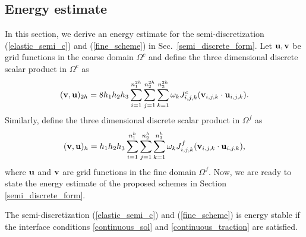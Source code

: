 \subsection{Energy estimate}\label{sec_energy}
In this section, we derive an energy estimate for the semi-discretization (\ref{elastic_semi_c}) and (\ref{fine_scheme}) in Sec.~\ref{semi_discrete_form}. Let ${\bf u}, {\bf v}$ be grid functions in the coarse domain $\Omega^c$ and define the three dimensional discrete scalar product in $\Omega^c$ as
\begin{equation}\label{scalar_product_inner}
({\bf v}, {\bf u})_{2h} = 8h_1h_2h_3\sum_{i=1}^{n_1^{2h}}\sum_{j=1}^{n_2^{2h}}\sum_{k=1}^{n_3^{2h}}\omega_k{J}_{i,j,k}^{c}({\bf v}_{i,j,k}\cdot {\bf u}_{i,j,k}).
\end{equation}
Similarly, define the three dimensional discrete scalar product in $\Omega^f$ as
\begin{equation}\label{scalar_product_inner_f}
({\bf v}, {\bf u})_{h} = h_1h_2h_3\sum_{i=1}^{n_1^{h}}\sum_{j=1}^{n_2^{h}}\sum_{k=1}^{n_3^{h}}\omega_k{J}_{i,j,k}^{f}({\bf v}_{i,j,k}\cdot {\bf u}_{i,j,k}),
\end{equation}
where $\bf u$ and $\bf v$ are grid functions in the fine domain $\Omega^f$. Now, we are ready to state the energy estimate of the proposed schemes in Section \ref{semi_discrete_form}. 
\begin{theorem}\label{thm1}
	The semi-discretization (\ref{elastic_semi_c}) and (\ref{fine_scheme}) is energy stable if the interface conditions \eqref{continuous_sol} and \eqref{continuous_traction} are satisfied.
\end{theorem}
